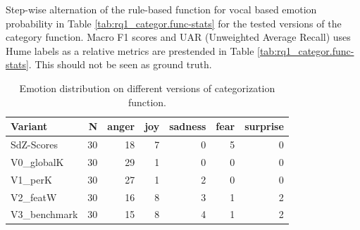 Step-wise alternation of the rule-based function for vocal based emotion probability in Table \ref{tab:rq1_categor.func-stats} for the tested versions of the category function. 
Macro F1 scores and UAR (Unweighted Average Recall) uses Hume labels as a relative metrics are prestended in Table \ref{tab:rq1_categor.func-stats}. This should not be seen as ground truth. 

\begin{table}[ht]
  \centering
  \begin{tabular}{lrrrrrr}
    \toprule
    Variant      &  N & anger & joy & sadness & fear & surprise \\
    \midrule
    SdZ-Scores   & 30 &    18 &   7 &       0 &    5 &        0 \\
    V0\_globalK  & 30 &    29 &   1 &       0 &    0 &        0 \\
    V1\_perK     & 30 &    27 &   1 &       2 &    0 &        0 \\
    V2\_featW   & 30 &    16 &   8 &       3 &    1 &        2 \\
    V3\_benchmark    & 30 &    15 &   8 &       4 &    1 &        2 \\
    \bottomrule
  \end{tabular}
  \caption{Emotion distribution on different versions of categorization function.}
  \label{tab:rq1_emotion-cat-labels}
\end{table}

